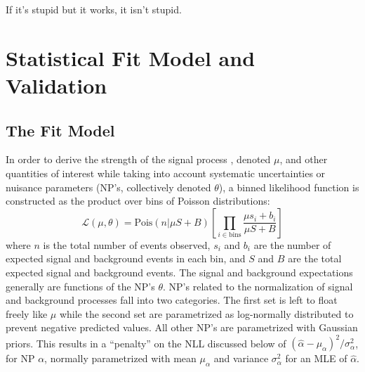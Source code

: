 \begin{savequote}[75mm]
If it's stupid but it works, it isn't stupid.
\end{savequote}

\chapter{Statistical Fit Model and Validation}

\section{The Fit Model}
In order to derive the strength of the signal process \ZH, denoted $\mu$, and other quantities of interest while taking into account systematic uncertainties or nuisance parameters (NP's, collectively denoted $\theta$), a binned likelihood function is constructed as the product over bins of Poisson distributions:
\begin{equation}
\label{eqn:like}
\mathcal{L}\left(\mu,\theta\right)=\text{Pois}\left(n\right.\left|\mu S+B\right)\left[\prod_{i\in\text{bins}}\frac{\mu s_i+b_i}{\mu S+B}\right]
\end{equation}
where $n$ is the total number of events observed, $s_i$ and $b_i$ are the number of expected signal and background events in each bin, and $S$ and $B$ are the total expected signal and background events.  The signal and background expectations generally are functions of the  NP's $\theta$.  NP's related to the normalization of signal and background processes fall into two categories.  The first set is left to float freely like $\mu$ while the second set are parametrized as log-normally distributed to prevent negative predicted values.  All other NP's are parametrized with Gaussian priors.  This results in a ``penalty'' on the NLL discussed below of $\left(\hat{\alpha}-\mu_{\alpha}\right)^2/\sigma_{\alpha}^2$, for NP $\alpha$, normally parametrized with mean $\mu_{\alpha}$ and variance $\sigma_{\alpha}^2$ for an MLE of $\hat{\alpha}$.

